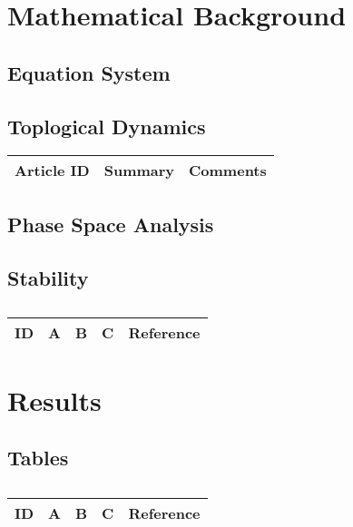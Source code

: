 \section{Mathematical Background}


\subsection{Equation System}




\subsection{Toplogical Dynamics}

\begin{table}[H]\centering
	\begin{tabular}{p{1cm}p{4cm}p{3cm}}
		Article ID & Summary & Comments\\
		\hline
		\hline
	\end{tabular}
\end{table}

\subsection{Phase Space Analysis}

\subsection{Stability}
\centering
\begin{table}[H]\footnotesize
	\caption{}
	\begin{tabular}{rp{1cm}p{2cm}p{3cm}p{1cm}}
		\hline
		ID & A & B & C & Reference \\
		\hline
		\hline
	\end{tabular}
\end{table}
\raggedright


\section{Results}


\subsection{Tables}

\centering
\begin{table}[H]\footnotesize
	\caption{}
	\begin{tabular}{rp{1cm}p{2cm}p{3cm}p{1cm}}
		\hline
		ID & A & B & C & Reference \\
		\hline
		\hline
	\end{tabular}
\end{table}
\raggedright

